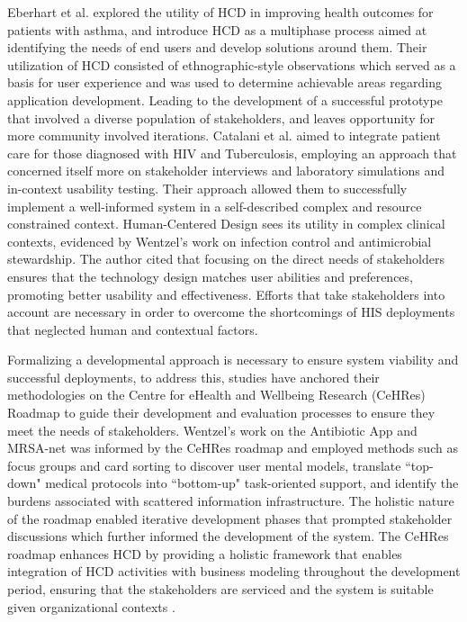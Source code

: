 \documentclass[11pt,a4paper,titlepage]{article}
\begin{document}
	Eberhart et al. \cite{eberhart_2019_using} explored the utility of HCD in improving health outcomes for patients with asthma, and introduce HCD as a multiphase process aimed at identifying the needs of end users and develop solutions around them. Their utilization of HCD consisted of ethnographic-style observations which served as a basis for user experience and was used to determine achievable areas regarding application development. Leading to the development of a successful prototype that involved a diverse population of stakeholders, and leaves opportunity for more community involved iterations. Catalani et al. \cite{catalani_2014_a} aimed to integrate patient care for those diagnosed with HIV and Tuberculosis, employing an approach that concerned itself more on stakeholder interviews and laboratory simulations and in-context usability testing. Their approach allowed them to successfully implement a well-informed system in a self-described complex and resource constrained context. Human-Centered Design sees its utility in complex clinical contexts, evidenced by Wentzel's \cite{wentzel_keeping_an_eye} work on infection control and antimicrobial stewardship. The author cited that focusing on the direct needs of stakeholders ensures that the technology design matches user abilities and preferences, promoting better usability and effectiveness. Efforts that take stakeholders into account are necessary in order to overcome the shortcomings of HIS deployments that neglected human and contextual factors. 
	
	
	Formalizing a developmental approach is necessary to ensure system viability and successful deployments, to address this, studies have anchored their methodologies on the Centre for eHealth and Wellbeing Research (CeHRes) Roadmap \cite{Kip2025CeHRes} to guide their development and evaluation processes to ensure they meet the needs of stakeholders. Wentzel's \cite{wentzel_keeping_an_eye} work on the Antibiotic App and MRSA-net was informed by the CeHRes roadmap and employed methods such as focus groups and card sorting to discover user mental models, translate ``top-down" medical protocols into ``bottom-up" task-oriented support, and identify the burdens associated with scattered information infrastructure. The holistic nature of the roadmap enabled iterative development phases that prompted stakeholder discussions which further informed the development of the system. The CeHRes roadmap enhances HCD by providing a holistic framework that enables integration of HCD activities with business modeling throughout the development period, ensuring that the stakeholders are serviced and the system is suitable given organizational contexts \cite{wentzel_keeping_an_eye,Kip2025CeHRes,vanVelsen2012Personas}.
	
\end{document}
